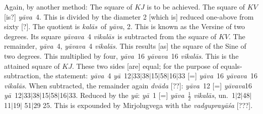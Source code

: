 \documentclass[12pt]{book}
\def\kalas{\textit{ka\-l\=as}}
\def\ya{\textit{y\=a}}
\def\yava{\textit{y\=ava}}
\def\yavava{\textit{y\=avava}}
\def\vikalas{\textit{vi\-ka\-l\=as}}
\def\danda{$|$}
\begin{document}
Again, by another method: The square of $KJ$ is to be achieved. The square of $KV$
[is?] \yava\ 4. This is divided by the diameter 2 [which is] reduced one-above from sixty [?].
The quotient is \kalas\ of \yava, 2. This is known as the Versine of two degrees. 
Its square \yavava\ 4 \vikalas\ is subtracted from the square of $KV$. The remainder, 
\yava\ 4, \yavava\ 4 \vikalas.  This results [as] the square of the Sine of two degrees.
This 
multiplied by four, \yava\ 16 \yavava\ 16 \vikalas. This is the attained square of $KJ$. 
These two sides [are] equal; for the purpose of equals-subtraction, the statement:
\yava\ 4 \ya\ 12\danda 33\danda 38\danda 15\danda 58\danda 16\danda 33 
[=]
\yava\ 16 \yavava\ 16 \vikalas. When subtracted, the remainder again \textit{dv\=ada} [??]:
\yava\ 12 [=] \yavava 16 \ya\ 12\danda 33\danda 38\danda 15\danda 58\danda 16\danda 33.
Reduced by the \ya: 
\ya\ 1 [=] \yava\ $\frac{1}{2}$ \vikalas, un.\ 1\danda 2\danda 48\danda 11\danda 19\danda
51\danda 29 25. 
This is expounded by Mirjolugvega with the \textit{vadgupray\=a\'sa} [???]. 
\end{document}

